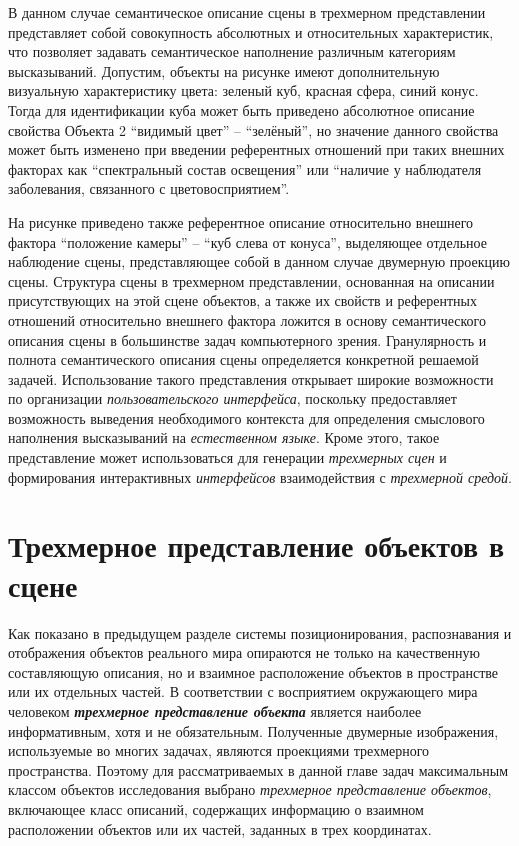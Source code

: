 В данном случае семантическое описание сцены в трехмерном представлении представляет собой совокупность абсолютных и относительных характеристик, что позволяет задавать семантическое наполнение различным категориям высказываний. Допустим, объекты на рисунке имеют дополнительную визуальную характеристику цвета: зеленый куб, красная сфера, синий конус. Тогда для идентификации куба может быть приведено абсолютное описание свойства Объекта 2 ``видимый цвет'' -- ``зелёный'', но значение данного свойства может быть изменено при введении референтных отношений при таких внешних факторах как ``спектральный состав освещения'' или ``наличие у наблюдателя заболевания, связанного с цветовосприятием''. 

На рисунке приведено также референтное описание относительно внешнего фактора ``положение камеры'' -- ``куб слева от конуса'', выделяющее отдельное наблюдение сцены, представляющее собой в данном случае двумерную проекцию сцены. Структура сцены в трехмерном представлении, основанная на описании присутствующих на этой сцене объектов, а также их свойств и референтных отношений относительно внешнего фактора ложится в основу семантического описания сцены в большинстве задач компьютерного зрения. Гранулярность и полнота семантического описания сцены определяется конкретной решаемой задачей. Использование такого представления открывает широкие возможности по организации \textit{пользовательского интерфейса}, поскольку предоставляет возможность выведения необходимого контекста для определения смыслового наполнения высказываний на \textit{естественном языке}. Кроме этого, такое представление может использоваться для генерации \textit{трехмерных сцен} и формирования интерактивных \textit{интерфейсов} взаимодействия с \textit{трехмерной средой}.


\section{Трехмерное представление объектов в сцене}
\label{sec_3d_models_representation}

Как показано в предыдущем разделе системы позиционирования, распознавания и отображения объектов реального мира опираются не только на качественную составляющую описания, но и взаимное расположение объектов в пространстве или их отдельных частей. В соответствии с восприятием окружающего мира человеком \textbf{\textit{трехмерное представление объекта}} является наиболее информативным, хотя и не обязательным. Полученные двумерные изображения, используемые во многих задачах, являются проекциями трехмерного пространства. Поэтому для рассматриваемых в данной главе задач максимальным классом объектов исследования выбрано \textit{трехмерное представление объектов}, включающее класс описаний, содержащих информацию о взаимном расположении объектов или их частей, заданных в трех координатах.

